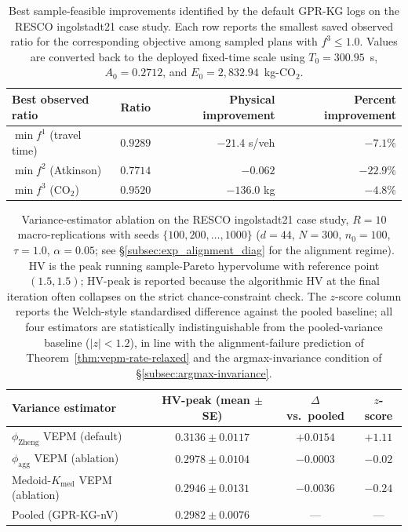 \documentclass[12pt]{article}
\theoremstyle{plain}
\theoremstyle{definition}
\theoremstyle{remark}
\begin{document}
\begin{table}[t]
  \centering
  \caption{Best sample-feasible improvements identified by the default
  GPR-KG logs on the RESCO ingolstadt21 case study.  Each row reports the
  smallest saved observed ratio for the corresponding objective among
  sampled plans with $f^3\le 1.0$.  Values are converted back to the
  deployed fixed-time scale using $T_{0}=300.95$~s, $A_{0}=0.2712$, and
  $E_{0}=2{,}832.94$~kg-CO$_2$.}
  \label{tab:case-improvements}
  \small
  \begin{tabular}{l c r r}
    \toprule
    Best observed ratio & Ratio & Physical improvement & Percent improvement \\
    \midrule
    $\min f^{1}$ (travel time) & $0.9289$ & $-21.4$ s/veh & $-7.1\%$ \\
    $\min f^{2}$ (Atkinson)    & $0.7714$ & $-0.062$     & $-22.9\%$ \\
    $\min f^{3}$ (CO$_2$)      & $0.9520$ & $-136.0$ kg  & $-4.8\%$ \\
    \bottomrule
  \end{tabular}
\end{table}

\begin{table}[t]
  \centering
  \caption{Variance-estimator ablation on the RESCO ingolstadt21 case study,
  $R=10$ macro-replications with seeds $\{100, 200, \ldots, 1000\}$
  ($d=44$, $N=300$, $n_0=100$, $\tau=1.0$, $\alpha=0.05$; see
  \S\ref{subsec:exp_alignment_diag} for the alignment regime).
  HV is the peak running sample-Pareto hypervolume with reference
  point $(1.5,1.5)$; HV-peak is reported because the algorithmic HV at
  the final iteration often collapses on the strict chance-constraint
  check.  The $z$-score column reports the Welch-style standardised
  difference against the pooled baseline; all four estimators are
  statistically indistinguishable from the pooled-variance baseline
  ($|z|<1.2$), in line with the alignment-failure prediction of
  Theorem~\ref{thm:vepm-rate-relaxed} and the
  argmax-invariance condition of \S\ref{subsec:argmax-invariance}.}
  \label{tab:case-vepm-vs-pooled}
  \small
  \begin{tabular}{l c c c}
    \toprule
    Variance estimator & HV-peak (mean $\pm$ SE) & $\Delta$ vs.\ pooled & $z$-score \\
    \midrule
    $\phi_{\mathrm{Zheng}}$ VEPM (default)    & $0.3136 \pm 0.0117$ & $+0.0154$ & $+1.11$ \\
    $\phi_{\mathrm{agg}}$ VEPM (ablation)     & $0.2978 \pm 0.0104$ & $-0.0003$ & $-0.02$ \\
    Medoid-$K_{\mathrm{med}}$ VEPM (ablation) & $0.2946 \pm 0.0131$ & $-0.0036$ & $-0.24$ \\
    Pooled (GPR-KG-nV)                        & $0.2982 \pm 0.0076$ & ---       & ---     \\
    \bottomrule
  \end{tabular}
\end{table}
\end{document}
